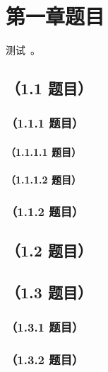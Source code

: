 \chapter{第一章题目}
测试~。

\section{（1.1 题目）}


\subsection{（1.1.1 题目）}






\subsubsection{（1.1.1.1 题目）}


\subsubsection{（1.1.1.2 题目）}

\subsection{（1.1.2 题目）}


\section{（1.2 题目）}


\section{（1.3 题目）}


\subsection{（1.3.1 题目）}


\subsection{（1.3.2 题目）}

